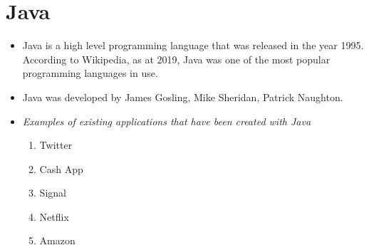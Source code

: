 \documentclass{article}
\begin{document}
	\section{Java}
	\begin{itemize}
		\item Java is a high level programming language that was released in the year 1995. According to Wikipedia, as at 2019, Java was one of the most popular programming languages in use.
		\item 	Java was developed by James Gosling, Mike Sheridan, Patrick Naughton.
		\item \textit{Examples of existing applications that have been created with Java}
		\begin{enumerate}
			\item Twitter
			\item Cash App
			\item Signal
			\item Netflix
			\item Amazon
		\end{enumerate}
	\end{itemize}
\end{document}
